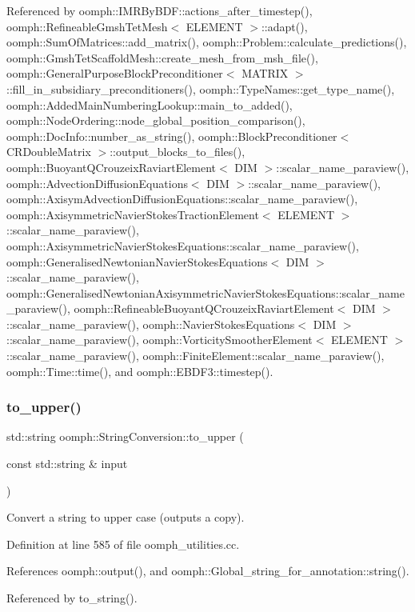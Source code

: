Referenced by oomph\+::\+I\+M\+R\+By\+B\+D\+F\+::actions\+\_\+after\+\_\+timestep(), oomph\+::\+Refineable\+Gmsh\+Tet\+Mesh$<$ E\+L\+E\+M\+E\+N\+T $>$\+::adapt(), oomph\+::\+Sum\+Of\+Matrices\+::add\+\_\+matrix(), oomph\+::\+Problem\+::calculate\+\_\+predictions(), oomph\+::\+Gmsh\+Tet\+Scaffold\+Mesh\+::create\+\_\+mesh\+\_\+from\+\_\+msh\+\_\+file(), oomph\+::\+General\+Purpose\+Block\+Preconditioner$<$ M\+A\+T\+R\+I\+X $>$\+::fill\+\_\+in\+\_\+subsidiary\+\_\+preconditioners(), oomph\+::\+Type\+Names\+::get\+\_\+type\+\_\+name(), oomph\+::\+Added\+Main\+Numbering\+Lookup\+::main\+\_\+to\+\_\+added(), oomph\+::\+Node\+Ordering\+::node\+\_\+global\+\_\+position\+\_\+comparison(), oomph\+::\+Doc\+Info\+::number\+\_\+as\+\_\+string(), oomph\+::\+Block\+Preconditioner$<$ C\+R\+Double\+Matrix $>$\+::output\+\_\+blocks\+\_\+to\+\_\+files(), oomph\+::\+Buoyant\+Q\+Crouzeix\+Raviart\+Element$<$ D\+I\+M $>$\+::scalar\+\_\+name\+\_\+paraview(), oomph\+::\+Advection\+Diffusion\+Equations$<$ D\+I\+M $>$\+::scalar\+\_\+name\+\_\+paraview(), oomph\+::\+Axisym\+Advection\+Diffusion\+Equations\+::scalar\+\_\+name\+\_\+paraview(), oomph\+::\+Axisymmetric\+Navier\+Stokes\+Traction\+Element$<$ E\+L\+E\+M\+E\+N\+T $>$\+::scalar\+\_\+name\+\_\+paraview(), oomph\+::\+Axisymmetric\+Navier\+Stokes\+Equations\+::scalar\+\_\+name\+\_\+paraview(), oomph\+::\+Generalised\+Newtonian\+Navier\+Stokes\+Equations$<$ D\+I\+M $>$\+::scalar\+\_\+name\+\_\+paraview(), oomph\+::\+Generalised\+Newtonian\+Axisymmetric\+Navier\+Stokes\+Equations\+::scalar\+\_\+name\+\_\+paraview(), oomph\+::\+Refineable\+Buoyant\+Q\+Crouzeix\+Raviart\+Element$<$ D\+I\+M $>$\+::scalar\+\_\+name\+\_\+paraview(), oomph\+::\+Navier\+Stokes\+Equations$<$ D\+I\+M $>$\+::scalar\+\_\+name\+\_\+paraview(), oomph\+::\+Vorticity\+Smoother\+Element$<$ E\+L\+E\+M\+E\+N\+T $>$\+::scalar\+\_\+name\+\_\+paraview(), oomph\+::\+Finite\+Element\+::scalar\+\_\+name\+\_\+paraview(), oomph\+::\+Time\+::time(), and oomph\+::\+E\+B\+D\+F3\+::timestep().

\mbox{\label{namespaceoomph_1_1StringConversion_afdee5876392b9daa3563484f63a9b55f}} 
\subsubsection{\texorpdfstring{to\+\_\+upper()}{to\_upper()}}
{\footnotesize\ttfamily std\+::string oomph\+::\+String\+Conversion\+::to\+\_\+upper (\begin{DoxyParamCaption}\item[{const std\+::string \&}]{input }\end{DoxyParamCaption})}



Convert a string to upper case (outputs a copy). 



Definition at line 585 of file oomph\+\_\+utilities.\+cc.



References oomph\+::output(), and oomph\+::\+Global\+\_\+string\+\_\+for\+\_\+annotation\+::string().



Referenced by to\+\_\+string().

